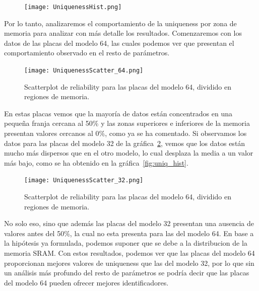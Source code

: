 \documentclass[spanish]{template/minim}
\begin{document}
\begin{figure}[H]
    \centering
    \texttt{[image: UniquenessHist.png]}
\end{figure}

Por lo tanto, analizaremos el comportamiento de la uniqueness por zona de memoria para analizar con más detalle los resultados. Comenzaremos con los datos de las placas del modelo 64, las cuales podemos ver que presentan el comportamiento observado en el resto de parámetros.\\

\begin{fullwidth}
\begin{figure}[H]
    \centering
    \texttt{[image: UniquenessScatter\_64.png]}
    \caption[Scatterplot de uniqueness para el modelo 64]{
            Scatterplot de reliability para las placas del modelo 64, dividido en regiones de memoria.\label{fig:rel_scatter_zoom64}
    }
\end{figure}
\end{fullwidth}

En estas placas vemos que la mayoría de datos están concentrados en una pequeña franja cercana al 50\% y las zonas superiores e inferiores de la memoria presentan valores cercanos al 0\%, como ya se ha comentado. Si observamos los datos para las placas del modelo 32 de la gráfica~\ref{fig:rel_scatter_zoom32}, vemos que los datos están mucho más dispersos que en el otro modelo, lo cual desplaza la media a un valor más bajo, como se ha obtenido en la gráfica~\ref{fig:uniq_hist}.\\

\begin{fullwidth}
\begin{figure}[H]
    \centering
    \texttt{[image: UniquenessScatter\_32.png]}
    \caption[Scatterplot de uniqueness para el modelo 32]{
            Scatterplot de reliability para las placas del modelo 64, dividido en regiones de memoria.\label{fig:rel_scatter_zoom32}
    }
\end{figure}
\end{fullwidth}

No solo eso, sino que además las placas del modelo 32 presentan una ausencia de valores antes del 50\%, la cual no esta presenta para las del modelo 64. En base a la hipótesis ya formulada, podemos suponer que se debe a la distribucion de la memoria SRAM. Con estos resultados, podemos ver que las placas del modelo 64 proporcionan mejores valores de uniqueness que las del modelo 32, por lo que sin un análisis más profundo del resto de parámetros se podría decir que las placas del modelo 64 pueden ofrecer mejores identificadores.\\
\end{document}
